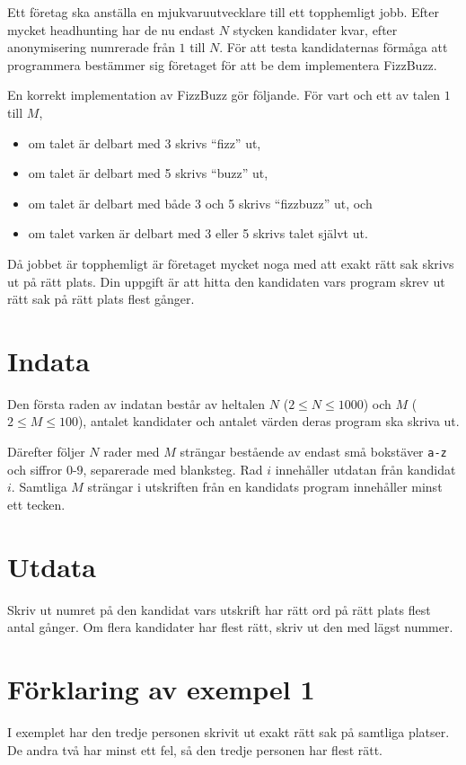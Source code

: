 Ett företag ska anställa en mjukvaruutvecklare till ett topphemligt jobb.
Efter mycket headhunting har de nu endast $N$ stycken kandidater kvar, efter anonymisering numrerade från $1$ till $N$.
För att testa kandidaternas förmåga att programmera bestämmer sig företaget för att be dem implementera FizzBuzz.

En korrekt implementation av FizzBuzz gör följande.
För vart och ett av talen $1$ till $M$,
\begin{itemize}
 \item om talet är delbart med 3 skrivs ``fizz'' ut,
 \item om talet är delbart med 5 skrivs ``buzz'' ut,
 \item om talet är delbart med både 3 och 5 skrivs ``fizzbuzz'' ut, och
 \item om talet varken är delbart med 3 eller 5 skrivs talet självt ut. 
\end{itemize}

Då jobbet är topphemligt är företaget mycket noga med att exakt rätt sak skrivs ut på rätt plats.
Din uppgift är att hitta den kandidaten vars program skrev ut rätt sak på rätt plats flest gånger.

\section*{Indata}
Den första raden av indatan består av heltalen $N$ ($2 \leq N \leq 1000$) och $M$ ($2 \leq M \leq 100$), antalet kandidater och antalet värden deras program ska skriva ut.

Därefter följer $N$ rader med $M$ strängar bestående av endast små bokstäver \texttt{a-z} och siffror $0$-$9$, separerade med blanksteg.
Rad $i$ innehåller utdatan från kandidat $i$.
Samtliga $M$ strängar i utskriften från en kandidats program innehåller minst ett tecken.

\section*{Utdata}
Skriv ut numret på den kandidat vars utskrift har rätt ord på rätt plats flest antal gånger.
Om flera kandidater har flest rätt, skriv ut den med lägst nummer.

\section*{Förklaring av exempel 1}
I exemplet har den tredje personen skrivit ut exakt rätt sak på samtliga platser.
De andra två har minst ett fel, så den tredje personen har flest rätt.

